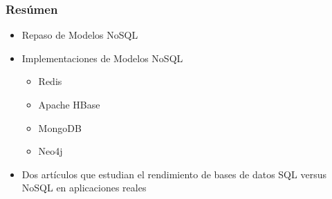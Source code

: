 \begin{frame}
    \frametitle{Resúmen}

    \begin{itemize}
        \item Repaso de Modelos NoSQL

         
        
        \item Implementaciones de Modelos NoSQL

        \begin{itemize}
            \item Redis
            \item Apache HBase
            \item MongoDB
            \item Neo4j
        \end{itemize}

         
        
        \item Dos artículos que estudian el rendimiento de bases de datos SQL versus NoSQL en aplicaciones reales
    \end{itemize}
    
\end{frame}